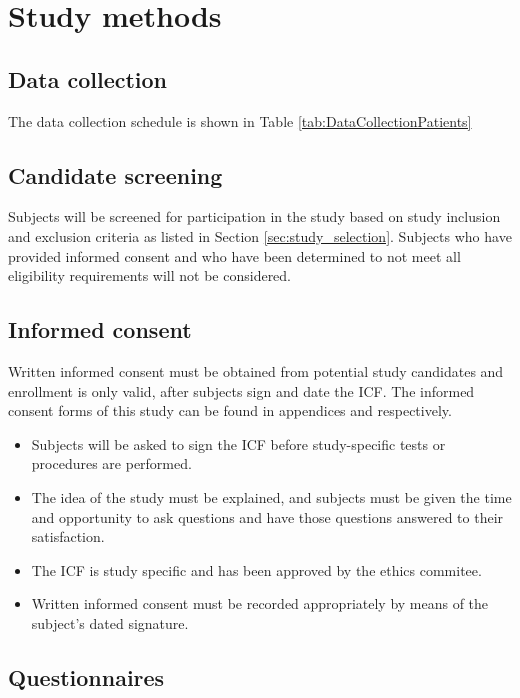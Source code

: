 \section{Study methods}
\subsection{Data collection}
The data collection schedule is shown in Table \ref{tab:DataCollectionPatients}


\subsection{Candidate screening}
\label{subsec:screening}
Subjects will be screened for participation in the study based on study inclusion and exclusion criteria as listed in Section \ref{sec:study_selection}. Subjects who have provided informed consent and who have been determined to not meet all eligibility requirements will not be considered.

\subsection{Informed consent}
Written informed consent must be obtained from potential study candidates and enrollment is only valid, after subjects sign and date the \ac{ICF}. The informed consent forms of this study can be found in appendices \label{sec:icf_patient} and \label{sec:icf_relative} respectively.

\begin{itemize}[noitemsep, topsep=0pt]
\item Subjects will be asked to sign the \ac{ICF} before study-specific tests or procedures are performed.
\item The idea of the study must be explained, and subjects must be given the time and opportunity to ask questions and have those questions answered to their satisfaction.
\item The \ac{ICF} is study specific and has been approved by the ethics commitee.
\item Written informed consent must be recorded appropriately by means of the subject’s dated signature.
\end{itemize}

\subsection{Questionnaires}
\label{subsec:questionnaires}
